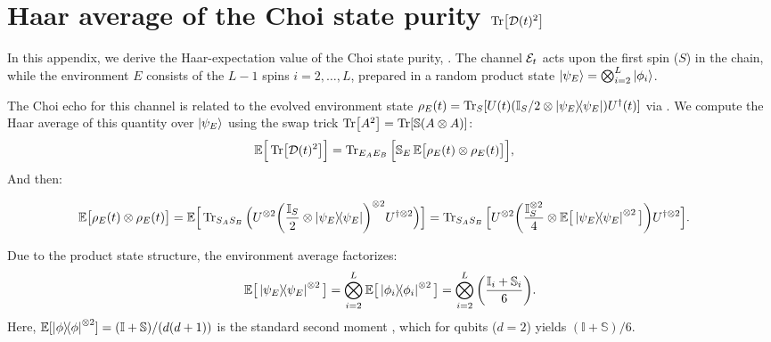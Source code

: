 \appendix
\section{Haar average of the Choi state purity $\Tr[\mathcal{D}(t)^2]$}
\label{app:haar}
In this appendix, we derive the Haar-expectation value of the
Choi state purity, . The channel $\mathcal{E}_t$
acts upon the first spin ($S$) in the chain,
while the environment $E$ consists of the $L-1$ spins
$i=2, \dots, L$, prepared in a random product state
$\ket{\psi_E} = \bigotimes_{i=2}^L \ket{\phi_i}$.

The Choi echo for this channel is related to the evolved
environment state $\rho_E(t) = \Tr_S[U(t) (\mathbb{I}_S/2 \otimes
\dyad{\psi_E}) U^\dagger(t)]$ via
\DIFdelbegin {}\DIFdelend \DIFaddbegin {}\DIFaddend .
We compute the Haar average of this quantity over $\ket{\psi_E}$
using the swap trick $\Tr[A^2] = \Tr[\mathbb{S} (A \otimes A)]$:
\begin{align}
\mathbb{E}\Big[\Tr[\mathcal{D}(t)^2]\Big]
&= \Tr_{E_A E_B} \Big[
\mathbb{S}_E \, \mathbb{E}\big[ \rho_E(t) \otimes \rho_E(t) \big] \Big],
\label{eq:app:avg_swap}
\end{align}
And then:
\begin{widetext}
\begin{align}
\mathbb{E}\big[ \rho_E(t) \otimes \rho_E(t) \big]
&= \mathbb{E}\Big[
\Tr_{S_A S_B} \Big(
U^{\otimes 2}
\qty( \frac{\mathbb{I}_S}{2} \otimes \dyad{\psi_E} )^{\otimes 2}
U^{\dagger \otimes 2}
\Big) \Big]
%
= \Tr_{S_A S_B} \Big[
U^{\otimes 2}
\qty( \frac{\mathbb{I}_S^{\otimes 2}}{4} \otimes
\mathbb{E}\big[\dyad{\psi_E}^{\otimes 2}\big] )
U^{\dagger \otimes 2}
\Big].
\label{eq:app:avg_rhoE_tensor}
\end{align}
\end{widetext}
Due to the product state structure, the environment average
factorizes:
\begin{equation}
\mathbb{E}\big[\dyad{\psi_E}^{\otimes 2}\big]
= \bigotimes_{i=2}^L
\mathbb{E}\big[\dyad{\phi_i}^{\otimes 2}\big]
= \bigotimes_{i=2}^L \qty( \frac{\mathbb{I}_i + \mathbb{S}_i}{6} ).
\label{eq:app:haar_moment_2_qubit}
\end{equation}
Here, $\mathbb{E}[\dyad{\phi}^{\otimes 2}] = (\mathbb{I} + \mathbb{S})/(d(d+1))$
is the standard second moment \cite{collins_2022_weingarten},
which for qubits ($d=2$) yields
$(\mathbb{I} + \mathbb{S})/6$.

